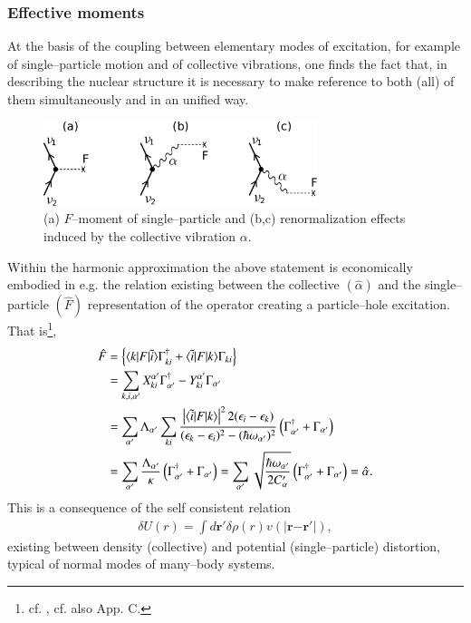 \begin{subappendices}
\subsubsection{Effective moments}
At the basis of the coupling between elementary modes of excitation, for example of single--particle motion and of collective vibrations, one finds the fact that, in describing the nuclear structure it is necessary to make reference to both (all) of them simultaneously and in an unified way.
   \begin{figure}
   \centerline{\includegraphics*[width=8cm,angle=0	]{nutshell/figs/fig3_A_1}}
   \caption{(a) $F$--moment of single--particle and (b,c) renormalization effects induced by the collective vibration $\alpha$.}\label{fig3.A.1}
   \end{figure}

Within the harmonic approximation the above statement is economically embodied in e.g. the relation existing between the collective $(\hat \alpha)$ and the single--particle $(\hat F)$ representation of the operator creating a particle--hole excitation. That is\footnote{cf. \cite{Bohr:75}, cf. also \cite{Brink:05} App. C.}, 
\begin{align}\label{eq1AppE1}
\nonumber \hat F&=\left\{\langle {k|F|\tilde i} \rangle\Gamma_{ki}^\dagger+\langle {\tilde i|F|k} \rangle\Gamma_{ki}\right\}\\
\nonumber &=\sum_{k,i,\alpha'}X_{ki}^{\alpha'}\Gamma_{\alpha'}^{\dagger}-Y_{ki}^{\alpha'}\Gamma_{\alpha'}\\
\nonumber &=\sum_{\alpha'}\Lambda_{\alpha'}\sum_{ki}\frac{\left|\langle {\tilde i|F|k} \rangle\right|^22(\epsilon_i-\epsilon_k)}{(\epsilon_k-\epsilon_i)^2-(\hbar\omega_{\alpha'})^2}\left(\Gamma_{\alpha'}^\dagger+\Gamma_{\alpha'}\right)\\
 &=\sum_{\alpha'}\frac{\Lambda_{\alpha'}}{\kappa}\left(\Gamma_{\alpha'}^{\dagger}+\Gamma_{\alpha'}\right)=\sum_{\alpha'}\sqrt{\frac{\hbar\omega_{\alpha'}}{2C_\alpha'}}\left(\Gamma_{\alpha'}^{\dagger}+\Gamma_{\alpha'}\right)=\hat \alpha.
\end{align}
This is a consequence of the self consistent relation
\begin{align}
\delta U(r)=\int d\mathbf r' \delta \rho(r)v(|\mathbf r{-\mathbf r'}|),
\end{align}
existing between density (collective) and potential (single--particle) distortion, typical of normal modes of many--body systems.


\end{subappendices}

